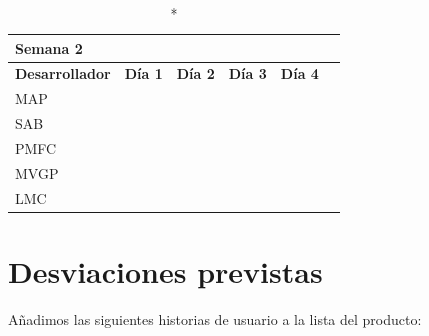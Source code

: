 \documentclass[11pt]{article}
\begin{document}
\begin{longtable}{lrrrrr}
  \caption*{Semana 2}\\
  \toprule
  \textbf{Desarrollador} & \textbf{Día 1} & \textbf{Día 2} & \textbf{Día 3} & \textbf{Día 4} \\
  \midrule
  MAP &  & \\
  SAB &  & \\
  PMFC \\
  MVGP & & \\
  LMC \\
  \bottomrule
\end{longtable}

\section{Desviaciones previstas}

Añadimos las siguientes historias de usuario a la lista del producto:
\end{document}
